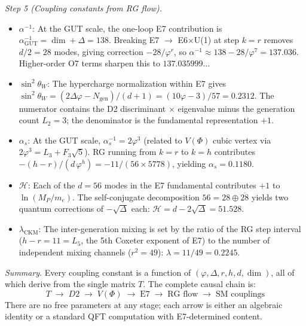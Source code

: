 \documentclass[11pt,a4paper]{article}
\begin{document}
\smallskip
\noindent\textit{Step 5 (Coupling constants from RG flow).}
\begin{itemize}
\item $\alpha^{-1}$: At the GUT scale, the one-loop E7 contribution is $\alpha^{-1}_{\mathrm{GUT}} = \dim + \Delta = 138$. Breaking E7 $\to$ E6$\times$U(1) at step $k = r$ removes $d/2 = 28$ modes, giving correction $-28/\varphi^r$, so $\alpha^{-1} \approx 138 - 28/\varphi^7 = 137.036$. Higher-order O7 terms sharpen this to $137.035999\ldots$
\item $\sin^2\theta_W$: The hypercharge normalization within E7 gives $\sin^2\theta_W = (2\Delta\varphi - N_{\mathrm{gen}})/(d+1) = (10\varphi - 3)/57 = 0.2312$. The numerator contains the D2 discriminant $\times$ eigenvalue minus the generation count $L_2 = 3$; the denominator is the fundamental representation $+1$.
\item $\alpha_s$: At the GUT scale, $\alpha_s^{-1} = 2\varphi^3$ (related to $V(\Phi)$ cubic vertex via $2\varphi^3 = L_3 + F_3\sqrt{5}$). RG running from $k = r$ to $k = h$ contributes $-(h-r)/(d\,\varphi^h) = -11/(56 \times 5778)$, yielding $\alpha_s = 0.1180$.
\item $\mathcal{H}$: Each of the $d = 56$ modes in the E7 fundamental contributes $+1$ to $\ln(M_P/m_e)$. The self-conjugate decomposition $56 = 28 \oplus \overline{28}$ yields two quantum corrections of $-\sqrt{\Delta}$ each: $\mathcal{H} = d - 2\sqrt{\Delta} = 51.528$.
\item $\lambda_{\mathrm{CKM}}$: The inter-generation mixing is set by the ratio of the RG step interval ($h - r = 11 = L_5$, the 5th Coxeter exponent of E7) to the number of independent mixing channels ($r^2 = 49$): $\lambda = 11/49 = 0.2245$.
\end{itemize}

\smallskip
\noindent\textit{Summary}. Every coupling constant is a function of $(\varphi, \Delta, r, h, d, \dim)$, all of which derive from the single matrix $T$. The complete causal chain is:
\begin{equation}
\boxed{T \;\longrightarrow\; D2 \;\longrightarrow\; V(\Phi) \;\longrightarrow\; \text{E7} \;\longrightarrow\; \text{RG flow} \;\longrightarrow\; \text{SM couplings}}
\end{equation}
There are no free parameters at any stage; each arrow is either an algebraic identity or a standard QFT computation with E7-determined content.

\end{document}
